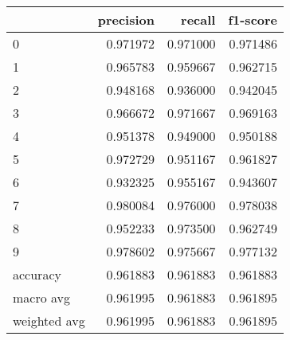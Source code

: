 \begin{tabular}{lrrr}
\toprule
 & precision & recall & f1-score \\
\midrule
0 & 0.971972 & 0.971000 & 0.971486 \\
1 & 0.965783 & 0.959667 & 0.962715 \\
2 & 0.948168 & 0.936000 & 0.942045 \\
3 & 0.966672 & 0.971667 & 0.969163 \\
4 & 0.951378 & 0.949000 & 0.950188 \\
5 & 0.972729 & 0.951167 & 0.961827 \\
6 & 0.932325 & 0.955167 & 0.943607 \\
7 & 0.980084 & 0.976000 & 0.978038 \\
8 & 0.952233 & 0.973500 & 0.962749 \\
9 & 0.978602 & 0.975667 & 0.977132 \\
accuracy & 0.961883 & 0.961883 & 0.961883 \\
macro avg & 0.961995 & 0.961883 & 0.961895 \\
weighted avg & 0.961995 & 0.961883 & 0.961895 \\
\bottomrule
\end{tabular}
